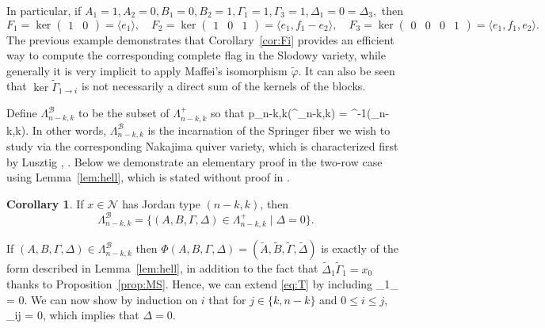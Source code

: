 \documentclass[11pt,reqno]{amsart}
\numberwithin{equation}{section}
\theoremstyle{definition}
\newtheorem{cor}[theorem]{Corollary}
\def\<{\langle}
\def\>{\rangle}
\newcommand{\cB}{\mathcal{B}}
\newcommand{\cN}{\mathcal{N}}
\newcommand{\inv}{^{-1}}
\newcommand{\tA}{\widetilde{A}}
\newcommand{\tB}{\widetilde{B}}
\newcommand{\tDe}{\widetilde{\Delta}}
\newcommand{\tGa}{\widetilde{\Gamma}}
\newcommand{\tphi}{\widetilde{\varphi}}
\begin{document}
In particular, if 
$
A_1 = 1, A_2 =0,
B_1 = 0, B_2 =1,
\Gamma_1 = 1, \Gamma_3 = 1,
\Delta_1 = 0 = \Delta_3,
$
then
\[
F_1 = \ker \begin{pmatrix} 1 & 0 \end{pmatrix} = \<e_1\>,
\quad
F_2 = \ker \begin{pmatrix} 1 & 0 & 1  \end{pmatrix} = \<e_1, f_1 - e_2\>,
\quad
F_3 = \ker \begin{pmatrix} 0 & 0 &0& 1  \end{pmatrix} = \<e_1, f_1, e_2\>.
\]
\endex
\rmk
The previous example demonstrates that Corollary~\ref{cor:Fi} provides an efficient way to compute the corresponding complete flag in the Slodowy variety, while generally it is very implicit to apply Maffei's isomorphism $\tphi$.
It can also be seen that $\ker \tGa_{1\to i}$ is not  {necessarily} a direct sum of the kernels of the blocks.
\endrmk


Define $\Lambda^\cB_{n-k,k}$ to be the subset of $\Lambda^+_{n-k,k}$ so that
\eq
p_{n-k,k}(\Lambda^\cB_{n-k,k}) = \tphi\inv(\cB_{n-k,k}).
\endeq
In other words, $\Lambda^\cB_{n-k,k}$ is the incarnation of the Springer fiber we wish to study via the corresponding Nakajima quiver variety, which is characterized first by Lusztig \cite[Prop. 14.2(a)]{Lu91}, \cite[Lemma 2.22]{Lu98}.
Below we demonstrate an elementary proof in the two-row case using Lemma~\ref{lem:hell}, which is stated without proof in \cite[Rmk.~24]{Maf05}.

\begin{cor}\label{cor:Spr}
If $x\in \cN$ has Jordan type $(n-k,k)$, then
\[
\Lambda^\cB_{n-k,k} = \{(A,B,\Gamma,\Delta) \in \Lambda^+_{n-k,k}\mid\Delta = 0 \}.
\]
\end{cor}
\proof
If $(A,B,\Gamma,\Delta) \in \Lambda^\cB_{n-k,k}$ then $\Phi(A,B,\Gamma, \Delta) = (\tA, \tB, \tGa, \tDe)$ is exactly of the form described in Lemma~\ref{lem:hell},
 in addition to the fact that $\tDe_1\tGa_1 = x_0$ thanks to Proposition~\ref{prop:MS}.
Hence, we can extend \eqref{eq:T} by including
\eq\label{eq:T2}
\Delta_{1\to}\Gamma_{} = 0.
\endeq   
We can now show by induction on $i$ that for $j \in \{k,n-k\}$ and $0\leq i \leq j$,  
\eq\label{eq:0claim}
\Delta_{i\to j} = 0,
\endeq
which implies that $\Delta = 0$.
\end{document}
